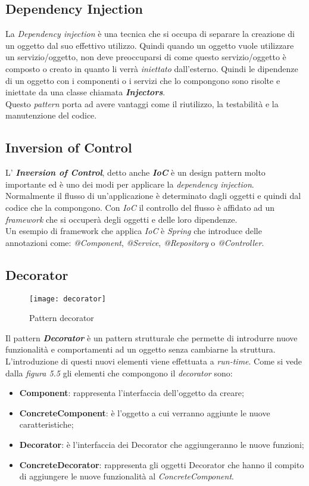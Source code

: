 \subsection*{Dependency Injection}
La \textit{Dependency injection} è una tecnica che si occupa di separare la creazione di un oggetto dal suo effettivo utilizzo. Quindi quando un oggetto vuole utilizzare un servizio/oggetto, non deve preoccuparsi di come questo servizio/oggetto è composto o creato in quanto li verrà \textit{iniettato} dall'esterno. Quindi le dipendenze di un oggetto con i componenti o i servizi che lo compongono sono risolte e iniettate da una classe chiamata \textbf{\textit{Injectors}}.\\
Questo \textit{pattern} porta ad avere vantaggi come il riutilizzo, la testabilità e la manutenzione del codice. 
\newpage
\subsection*{Inversion of Control}  
L' \textbf{\textit{Inversion of Control}}, detto anche \textbf{\textit{IoC}} è un design pattern molto importante ed è uno dei modi per applicare la \textit{dependency injection}.\\
Normalmente il flusso di un'applicazione è determinato dagli oggetti e quindi dal codice che la compongono. Con \textit{IoC} il controllo del flusso è affidato ad un \textit{framework} che si occuperà degli oggetti e delle loro dipendenze.\\
Un esempio di framework che applica \textit{IoC} è \textit{Spring} che introduce delle annotazioni come: \textit{@Component}, \textit{@Service}, \textit{@Repository} o \textit{@Controller}.

\subsection*{Decorator}
 \begin{figure}[H]
    \centering 
    \texttt{[image: decorator]} 
    \bigskip
    \caption{Pattern decorator}
\end{figure}

Il pattern \textit{\textbf{Decorator}} è un pattern strutturale che permette di introdurre nuove funzionalità e comportamenti ad un oggetto senza cambiarne la struttura. L'introduzione di questi nuovi elementi viene effettuata a \textit{run-time}.
Come si vede dalla \textit{figura 5.5} gli elementi che compongono il \textit{decorator} sono:
\begin{itemize}
\item \textbf{Component}: rappresenta l'interfaccia dell'oggetto da creare;
\item \textbf{ConcreteComponent}: è l'oggetto a cui verranno aggiunte le nuove caratteristiche;
\item \textbf{Decorator}: è l'interfaccia dei Decorator che aggiungeranno le nuove funzioni;			 
\item \textbf{ConcreteDecorator}: rappresenta gli oggetti Decorator che hanno il compito di aggiungere le nuove funzionalità al \textit{ConcreteComponent}. 
\end{itemize}
